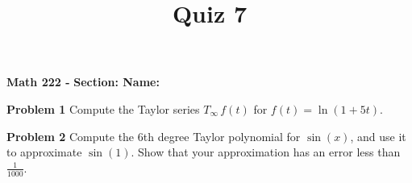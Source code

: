 \documentclass{article}
\title{Quiz 7}
\begin{document}
\begin{center}\makeatletter %
{ \bf Math 222 - \@title }
{ \bf \hfill Section: \underline{\hspace{2cm}} \hfill Name: \underline{\hspace{5cm}} }
\end{center}

{\bf Problem 1} \quad Compute the Taylor series $T_{\infty}\,f(t)$ for $\displaystyle f(t) = \ln(1 + 5t)$.


\vfill

{\bf Problem 2} \quad Compute the 6th degree Taylor polynomial for $\sin(x)$, and use it to approximate $\sin(1)$.  Show that your approximation has an error less than $\frac{1}{1000}$.


\vfill
\end{document}
